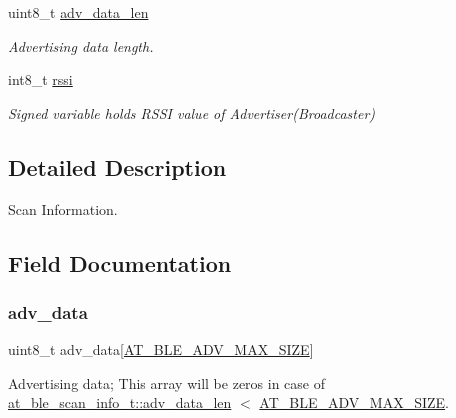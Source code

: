 \begin{DoxyCompactItemize}
uint8\+\_\+t \mbox{\hyperlink{structat__ble__scan__info__t_a75fd7fdf06a003b4e9b217d58cd6b077}{adv\+\_\+data\+\_\+len}}
\begin{DoxyCompactList}\small\item\em Advertising data length. \end{DoxyCompactList}\item 
int8\+\_\+t \mbox{\hyperlink{structat__ble__scan__info__t_a3b962e67ba74725bd60ca3c29f785abe}{rssi}}
\begin{DoxyCompactList}\small\item\em Signed variable holds R\+S\+SI value of Advertiser(\+Broadcaster) \end{DoxyCompactList}\end{DoxyCompactItemize}


\subsection{Detailed Description}
Scan Information. 

\subsection{Field Documentation}
\mbox{\label{structat__ble__scan__info__t_a4700ff1a40c166a4ac7ee2738d3f8cef}} 
\subsubsection{\texorpdfstring{adv\_data}{adv\_data}}
{\footnotesize\ttfamily uint8\+\_\+t adv\+\_\+data\mbox{[}\mbox{\hyperlink{at__ble__api_8h_addd26ee157ad73fa2ec9bdebf27c85b3}{A\+T\+\_\+\+B\+L\+E\+\_\+\+A\+D\+V\+\_\+\+M\+A\+X\+\_\+\+S\+I\+ZE}}\mbox{]}}



Advertising data; This array will be zeros in case of \mbox{\hyperlink{structat__ble__scan__info__t_a75fd7fdf06a003b4e9b217d58cd6b077}{at\+\_\+ble\+\_\+scan\+\_\+info\+\_\+t\+::adv\+\_\+data\+\_\+len}} $<$ \mbox{\hyperlink{at__ble__api_8h_addd26ee157ad73fa2ec9bdebf27c85b3}{A\+T\+\_\+\+B\+L\+E\+\_\+\+A\+D\+V\+\_\+\+M\+A\+X\+\_\+\+S\+I\+ZE}}. 

\mbox{\label{structat__ble__scan__info__t_a75fd7fdf06a003b4e9b217d58cd6b077}} 
